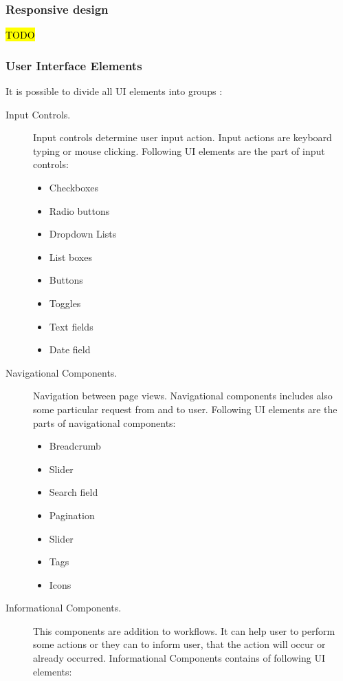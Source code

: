 \subsubsection{Responsive design}\label{Responsive design}

\hl{TODO}


\subsubsection{User Interface Elements}\label{User Interface Elements}

It is possible to divide all UI elements into groups \cite{intelligent_support}:

\begin{description}
\item[Input Controls.] Input controls determine user input action. Input actions are keyboard typing or mouse clicking.  Following UI elements are the part of input controls: 
\begin{itemize}
\item Checkboxes
\item Radio buttons 
\item Dropdown Lists
\item List boxes
\item Buttons
\item Toggles
\item Text fields
\item Date field
\end{itemize}
\item[Navigational Components.] Navigation between page views. Navigational components includes also some particular request from and to user. Following UI elements are the parts of navigational components:
\begin{itemize}
\item Breadcrumb 
\item Slider
\item Search field
\item Pagination
\item Slider
\item Tags
\item Icons
\end{itemize}
\item[Informational Components.] This components are addition to workflows. It can help user to perform some actions or they can to inform user, that the action will occur or already occurred. Informational Components contains of following UI elements:
\begin{itemize}

\end{itemize}
\end{description}
